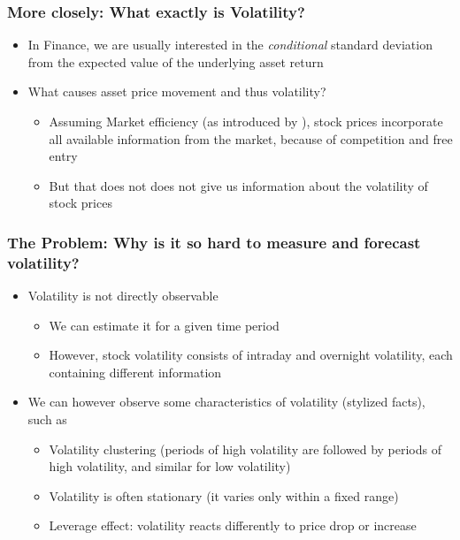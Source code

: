 \documentclass[aspectratio=169]{beamer}
\begin{document}
\begin{frame}
\frametitle{More closely: What exactly is Volatility?}
	\begin{itemize}
	\item In Finance, we are usually interested in the \textit{conditional} standard deviation from the expected value of the underlying asset return \parencite{tsay2005}
	\item What causes asset price movement and thus volatility?
		\begin{itemize}
		\item Assuming Market efficiency (as introduced by \citeauthor{fama1970}), stock prices incorporate all available information from the market, because of competition and free entry 
		\item But that does not does not give us information about the volatility of stock prices
		\end{itemize}
	\end{itemize}
\end{frame}

\begin{frame}
\frametitle{The Problem: Why is it so hard to measure and forecast volatility?}
	\begin{itemize}
	\item Volatility is not directly observable
		\begin{itemize}
		\item We can estimate it for a given time period 
		\item However, stock volatility consists of intraday and overnight volatility, each containing different information
		\end{itemize}
	\item We can however observe some characteristics of volatility (stylized facts), such as
		\begin{itemize}
		\item Volatility clustering (periods of high volatility are followed by periods of high volatility, and similar for low volatility)
		\item Volatility is often stationary (it varies only within a fixed range)
		\item Leverage effect: volatility reacts differently to price drop or increase
		\end{itemize}
	\end{itemize}
\end{frame}
\end{document}
